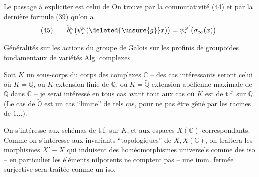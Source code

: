 Le passage à expliciter est celui de
On trouve par la commutativité (44) et par la dernière formule (39) qu'on a
\[
(45)\qquad\widetilde b_i^\omega\bigl(\psi_i^\omega(\deleted{\unsure{g}}x)\bigr)=\psi_i^{\omega'}\bigl(\sigma_\infty(x)\bigr).
\]

Généralités sur les actions du groupe de Galois sur les  profinis de groupoïdes fondamentaux de variétés Alg. complexes

Soit $K$ un sous-corps du corps des complexes $\mathbb C$ -- des cas intéressants seront celui où $K=\mathbb Q$, ou $K$ extension finie de $\mathbb Q$, ou $K=\widetilde{\mathbb Q}$ extension abélienne maximale de $\mathbb Q$ dans $\mathbb C$ -- je serai intéressé en tous cas avant tout aux cas où $K$ est de t.f. sur $\mathbb Q$. (Le cas de $\widetilde{\mathbb Q}$ est un cas ``limite'' de tels cas, pour ne pas être gêné par les racines de $1\ldots$).

On s'intéresse aux schémas  de t.f. sur $K$, et aux espaces  $X(\mathbb C)$ correspondants. Comme on s'intéresse aux invariants ``topologiques'' de $X,X(\mathbb C)$, on traitera les morphismes $X'-X$ qui induisent des homéomorphismes universels comme des iso -- en particulier les éléments nilpotents ne comptent pas -- une imm. fermée surjective sera traitée comme un iso.

